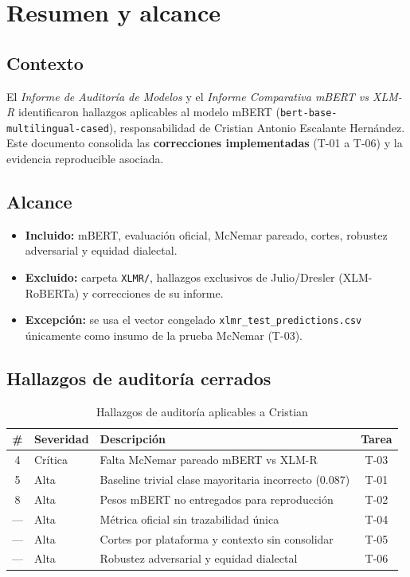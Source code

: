 \chapter{Resumen y alcance}

\section{Contexto}

El \emph{Informe de Auditoría de Modelos} \cite{auditoria2026} y el \emph{Informe Comparativa mBERT vs XLM-R} \cite{comparativa2026} identificaron hallazgos aplicables al modelo mBERT (\texttt{bert-base-multilingual-cased}), responsabilidad de Cristian Antonio Escalante Hernández. Este documento consolida las \textbf{correcciones implementadas} (T-01 a T-06) y la evidencia reproducible asociada.

\section{Alcance}

\begin{itemize}[noitemsep]
  \item \textbf{Incluido:} mBERT, evaluación oficial, McNemar pareado, cortes, robustez adversarial y equidad dialectal.
  \item \textbf{Excluido:} carpeta \texttt{XLMR/}, hallazgos exclusivos de Julio/Dresler (XLM-RoBERTa) y correcciones de su informe.
  \item \textbf{Excepción:} se usa el vector congelado \texttt{xlmr\_test\_predictions.csv} únicamente como insumo de la prueba McNemar (T-03).
\end{itemize}

\section{Hallazgos de auditoría cerrados}

\begin{table}[H]
  \centering
  \caption{Hallazgos de auditoría aplicables a Cristian}
  \label{tab:hallazgos}
  \begin{tabular}{clp{7cm}c}
    \toprule
    \# & Severidad & Descripción & Tarea \\
    \midrule
    4 & Crítica & Falta McNemar pareado mBERT vs XLM-R & T-03 \\
    5 & Alta & Baseline trivial clase mayoritaria incorrecto (0.087) & T-01 \\
    8 & Alta & Pesos mBERT no entregados para reproducción & T-02 \\
    --- & Alta & Métrica oficial sin trazabilidad única & T-04 \\
    --- & Alta & Cortes por plataforma y contexto sin consolidar & T-05 \\
    --- & Alta & Robustez adversarial y equidad dialectal & T-06 \\
    \bottomrule
  \end{tabular}
\end{table}

